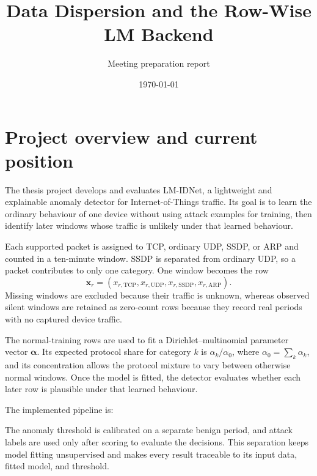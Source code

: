 \documentclass[11pt]{article}
\title{Data Dispersion and the Row-Wise LM Backend}
\author{Meeting preparation report}
\date{\today}
\begin{document}
\maketitle

\section{Project overview and current position}
\label{sec:project-overview}

The thesis project develops and evaluates LM-IDNet, a lightweight and
explainable anomaly detector for Internet-of-Things traffic. Its goal is to
learn the ordinary behaviour of one device without using attack examples for
training, then identify later windows whose traffic is unlikely under that
learned behaviour.

Each supported packet is assigned to TCP, ordinary UDP, SSDP, or ARP and
counted in a ten-minute window. SSDP is separated from ordinary UDP, so a packet
contributes to only one category. One window becomes the row
\[
  \mathbf{x}_r =
  (x_{r,\mathrm{TCP}},x_{r,\mathrm{UDP}},
   x_{r,\mathrm{SSDP}},x_{r,\mathrm{ARP}}).
\]
Missing windows are excluded because their traffic is unknown, whereas observed
silent windows are retained as zero-count rows because they record real periods
with no captured device traffic.

The normal-training rows are used to fit a Dirichlet--multinomial parameter
vector \(\boldsymbol{\alpha}\). Its expected protocol share for category \(k\)
is \(\alpha_k/\alpha_0\), where \(\alpha_0=\sum_k\alpha_k\), and its concentration
allows the protocol mixture to vary between otherwise normal windows. Once the
model is fitted, the detector evaluates whether each later row is plausible
under that learned behaviour.

The implemented pipeline is:
\begin{center}
\end{center}
The anomaly threshold is calibrated on a separate benign period, and attack
labels are used only after scoring to evaluate the decisions. This separation
keeps model fitting unsupervised and makes every result traceable to its input
data, fitted model, and threshold.
\end{document}
